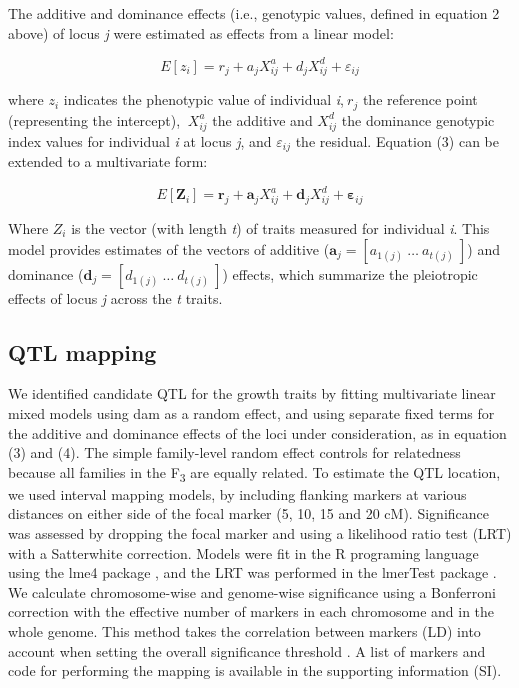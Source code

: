\begin{refsection}
The additive and dominance effects (i.e., genotypic values, defined in
equation 2 above) of locus \emph{j} were estimated as effects from a
linear model:

\begin{equation}
E\left\lbrack z_{i} \right\rbrack = r_{j} + a_{j}X_{ij}^{a} + d_{j}X_{ij}^{d} + \varepsilon_{ij}
\end{equation}

where \(z_{i}\) indicates the
phenotypic value of individual \emph{i},\(\ r_{j}\) the reference point
(representing the intercept), \(\ X_{ij}^{a}\) the additive and
\(X_{ij}^{d}\) the dominance genotypic index values for
individual \emph{i} at locus \emph{j}, and \(\varepsilon_{ij}\)
the residual. Equation (3) can be extended to a multivariate form:

\begin{equation}
E\left\lbrack \textbf{Z}_{i} \right\rbrack = \textbf{r}_{j} + \textbf{a}_{j}X_{ij}^{a} + \textbf{d}_{j}X_{ij}^{d} + \pmb \varepsilon_{ij}
\end{equation}

Where \(Z_{i}\) is the vector (with length \emph{t}) of traits measured
for individual \emph{i}. This model provides estimates of the vectors of
additive
(\(\textbf{a}_{j} = \left\lbrack a_{1(j)}\ \ldots\ a_{t(j)}\  \right\rbrack\))
and dominance
(\(\textbf{d}_{j} = \left\lbrack d_{1(j)}\ \ldots\ d_{t(j)}\  \right\rbrack\))
effects, which summarize the pleiotropic effects of locus \emph{j}
across the \emph{t} traits.

\subsection{QTL mapping}

We identified candidate QTL for the growth traits by fitting
multivariate linear mixed models using dam as a random effect, and using
separate fixed terms for the additive and dominance effects of the loci
under consideration, as in equation (3) and (4). The simple family-level
random effect controls for relatedness because all families in the
F\textsubscript{3} are equally related. To estimate the QTL location, we
used interval mapping models, by including flanking markers at various
distances on either side of the focal marker (5, 10, 15 and 20 cM).
Significance was assessed by dropping the focal marker and using a
likelihood ratio test (LRT) with a Satterwhite correction. Models were
fit in the R programing language using the lme4 package \parencite{Bates2008-gp}, and
the LRT was performed in the lmerTest package \parencite{Kuznetsova2017-fq}. We
calculate chromosome-wise and genome-wise significance using a
Bonferroni correction with the effective number of markers in each
chromosome and in the whole genome. This method takes the correlation
between markers (LD) into account when setting the overall significance
threshold \parencite{Nyholt2004-zm,Li2005-yu}. A list of markers and code for performing the mapping
is available in the supporting information (SI).


\end{refsection}
